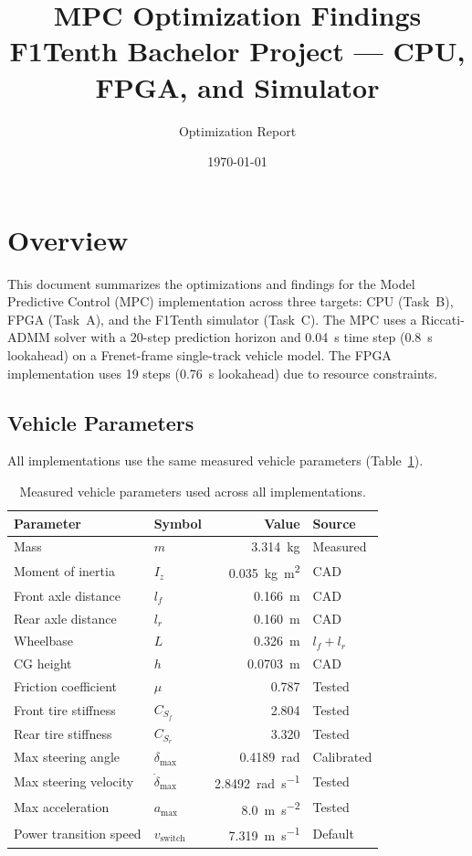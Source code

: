 \documentclass[11pt,a4paper]{article}
\title{MPC Optimization Findings\\
\large F1Tenth Bachelor Project --- CPU, FPGA, and Simulator}
\author{Optimization Report}
\date{\today}
\begin{document}
\maketitle

\tableofcontents
\newpage

\section{Overview}
This document summarizes the optimizations and findings for the Model Predictive Control (MPC) implementation across three targets: CPU (Task~B), FPGA (Task~A), and the F1Tenth simulator (Task~C). The MPC uses a Riccati-ADMM solver with a 20-step prediction horizon and \SI{0.04}{\second} time step (\SI{0.8}{\second} lookahead) on a Frenet-frame single-track vehicle model. The FPGA implementation uses 19 steps (\SI{0.76}{\second} lookahead) due to resource constraints.

\subsection{Vehicle Parameters}
All implementations use the same measured vehicle parameters (Table~\ref{tab:vehicle_params}).

\begin{table}[H]
\centering
\caption{Measured vehicle parameters used across all implementations.}
\label{tab:vehicle_params}
\begin{tabular}{@{}llrl@{}}
\toprule
\textbf{Parameter} & \textbf{Symbol} & \textbf{Value} & \textbf{Source} \\
\midrule
Mass & $m$ & \SI{3.314}{\kilo\gram} & Measured \\
Moment of inertia & $I_z$ & \SI{0.035}{\kilo\gram\meter\squared} & CAD \\
Front axle distance & $l_f$ & \SI{0.166}{\meter} & CAD \\
Rear axle distance & $l_r$ & \SI{0.160}{\meter} & CAD \\
Wheelbase & $L$ & \SI{0.326}{\meter} & $l_f + l_r$ \\
CG height & $h$ & \SI{0.0703}{\meter} & CAD \\
Friction coefficient & $\mu$ & 0.787 & Tested \\
Front tire stiffness & $C_{S_f}$ & 2.804 & Tested \\
Rear tire stiffness & $C_{S_r}$ & 3.320 & Tested \\
Max steering angle & $\delta_{\max}$ & \SI{0.4189}{\radian} & Calibrated \\
Max steering velocity & $\dot{\delta}_{\max}$ & \SI{2.8492}{\radian\per\second} & Tested \\
Max acceleration & $a_{\max}$ & \SI{8.0}{\meter\per\second\squared} & Tested \\
Power transition speed & $v_{\text{switch}}$ & \SI{7.319}{\meter\per\second} & Default \\
\bottomrule
\end{tabular}
\end{table}
\end{document}

